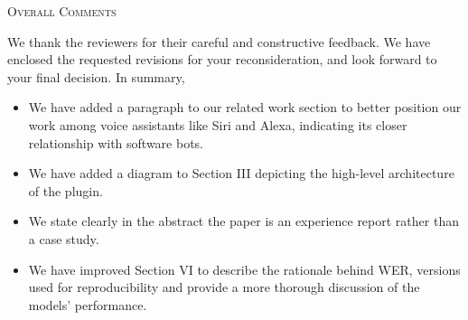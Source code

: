 \documentclass[journal,12pt,onecolumn,draftclsnofoot,]{IEEEtran}
\begin{document}
%
%
%
%
%

\begin{center}{\textsc{Overall Comments}}\end{center}

We thank the reviewers for their careful and constructive feedback. We have enclosed the requested revisions for your reconsideration, and look forward to your final decision. In summary,

\begin{itemize}
\item We have added a paragraph to our related work section to better position our work among voice assistants like Siri and Alexa, indicating its closer relationship with software bots.
\item We have added a diagram to Section III depicting the high-level architecture of the plugin.
\item We state clearly in the abstract the paper is an experience report rather than a case study.
\item We have improved Section VI to describe the rationale behind WER, versions used for reproducibility and provide a more thorough discussion of the models' performance.
\end{itemize}
\end{document}
